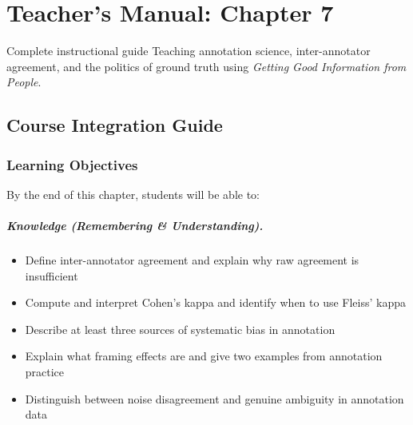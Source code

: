 
\chapter{Teacher's Manual: Chapter 7}
\label{ch:teacher-ch07}

\begin{chapterquote}{Complete instructional guide}
Teaching annotation science, inter-annotator agreement, and the politics of ground truth using \emph{Getting Good Information from People}.
\end{chapterquote}

\section{Course Integration Guide}

\subsection{Learning Objectives}

By the end of this chapter, students will be able to:

\paragraph{Knowledge (Remembering \& Understanding).}
\begin{itemize}
    \item Define inter-annotator agreement and explain why raw agreement is insufficient
    \item Compute and interpret Cohen's kappa and identify when to use Fleiss' kappa
    \item Describe at least three sources of systematic bias in annotation
    \item Explain what framing effects are and give two examples from annotation practice
    \item Distinguish between noise disagreement and genuine ambiguity in annotation data
\end{itemize}

